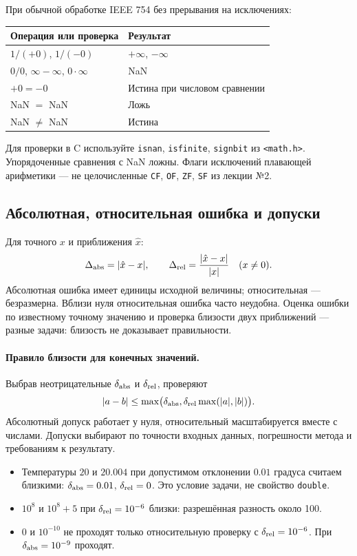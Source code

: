 При обычной обработке IEEE 754 без прерывания на исключениях:
\begin{center}
\begin{tabular}{|l|l|}
\hline
Операция или проверка & Результат \\
\hline
$1/(+0)$, $1/(-0)$ & $+\infty$, $-\infty$ \\
$0/0$, $\infty-\infty$, $0\cdot\infty$ & NaN \\
$+0=-0$ & Истина при числовом сравнении \\
NaN $=$ NaN & Ложь \\
NaN $\ne$ NaN & Истина \\
\hline
\end{tabular}
\end{center}
Для проверки в C используйте \texttt{isnan}, \texttt{isfinite},
\texttt{signbit} из \texttt{<math.h>}. Упорядоченные сравнения с NaN
ложны. Флаги исключений плавающей арифметики --- не целочисленные
\texttt{CF}, \texttt{OF}, \texttt{ZF}, \texttt{SF} из лекции №2.

\subsection{Абсолютная, относительная ошибка и допуски}
Для точного $x$ и приближения $\hat x$:
\[
\Delta_{\rm abs}=|\hat x-x|,\qquad
\Delta_{\rm rel}=\frac{|\hat x-x|}{|x|}\quad(x\ne0).
\]
Абсолютная ошибка имеет единицы исходной величины; относительная ---
безразмерна. Вблизи нуля относительная ошибка часто неудобна.
Оценка ошибки по известному точному значению и проверка близости двух
приближений --- разные задачи: близость не доказывает правильности.

\paragraph{Правило близости для конечных значений.}
Выбрав неотрицательные $\delta_{\rm abs}$ и $\delta_{\rm rel}$, проверяют
\[
|a-b|\le\max\bigl(\delta_{\rm abs},
\delta_{\rm rel}\max(|a|,|b|)\bigr).
\]
Абсолютный допуск работает у нуля, относительный масштабируется
вместе с числами. Допуски выбирают по точности входных данных,
погрешности метода и требованиям к результату.

\begin{itemize}
    \item Температуры $20$ и $20.004$ при допустимом отклонении
    $0.01$ градуса считаем близкими: $\delta_{\rm abs}=0.01$,
    $\delta_{\rm rel}=0$. Это условие задачи, не свойство \texttt{double}.
    \item $10^8$ и $10^8+5$ при $\delta_{\rm rel}=10^{-6}$ близки:
    разрешённая разность около 100.
    \item $0$ и $10^{-10}$ не проходят только относительную проверку
    с $\delta_{\rm rel}=10^{-6}$. При $\delta_{\rm abs}=10^{-9}$ проходят.
\end{itemize}

